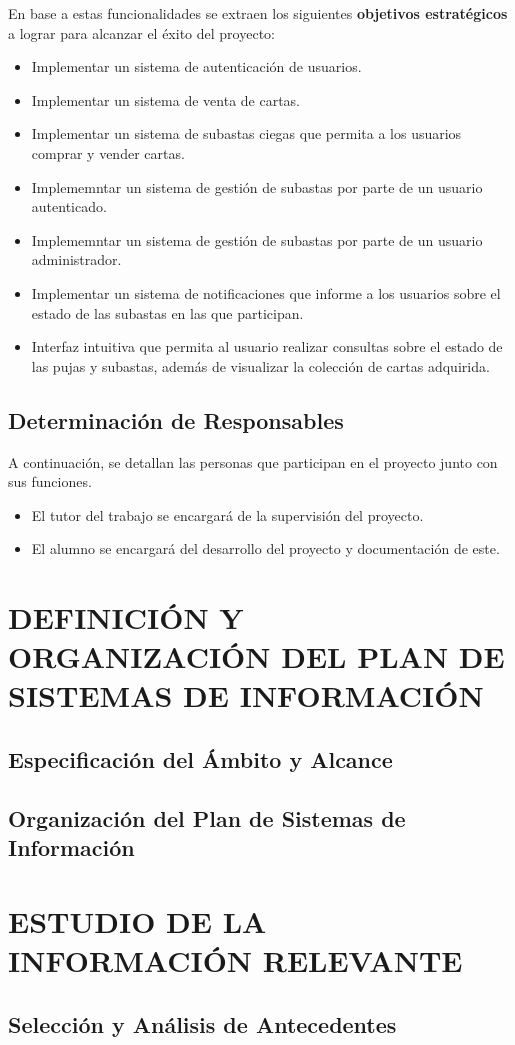 En base a estas funcionalidades se extraen los siguientes \textbf{objetivos estratégicos} a lograr para alcanzar el éxito del proyecto:

\begin{itemize}
    \item Implementar un sistema de autenticación de usuarios.
    \item Implementar un sistema de venta de cartas.
    \item Implementar un sistema de subastas ciegas que permita a los usuarios comprar y vender cartas.
    \item Implememntar un sistema de gestión de subastas por parte de un usuario autenticado.
    \item Implememntar un sistema de gestión de subastas por parte de un usuario administrador.
    \item Implementar un sistema de notificaciones que informe a los usuarios sobre el estado de las subastas en las que participan.
    \item Interfaz intuitiva que permita al usuario realizar consultas sobre el estado de las pujas y subastas, además de visualizar la colección de cartas adquirida.
\end{itemize}

\subsection{Determinación de Responsables}
A continuación, se detallan las personas que participan en el proyecto junto con sus funciones.
\begin{itemize}
    \item El tutor del trabajo se encargará de la supervisión del proyecto.
    \item El alumno se encargará del desarrollo del proyecto y documentación de este. 
\end{itemize}

\newpage
\section{DEFINICIÓN Y ORGANIZACIÓN DEL PLAN DE SISTEMAS DE INFORMACIÓN}
 

\subsection{Especificación del Ámbito y Alcance} 


\subsection{Organización del Plan de Sistemas de Información }



\newpage
\section{ESTUDIO DE LA INFORMACIÓN RELEVANTE}
 
\subsection{Selección y Análisis de Antecedentes} 
